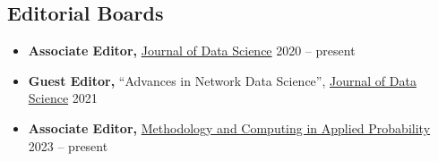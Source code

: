 \documentclass[12pt]{article}
\begin{document}
	
	\subsection*{Editorial Boards}
	\begin{itemize}
		\item \textbf{Associate Editor,} 
		\href{https://jds-online.org/journal/JDS}{Journal of Data Science} \hfill 2020 -- present
		\item \textbf{Guest Editor,} ``Advances in Network Data 
		Science'', \href{https://jds-online.org/journal/JDS}{Journal 
		of Data Science} \hfill 2021
		\item \textbf{Associate Editor,}
		\href{https://www.springer.com/journal/11009/}{Methodology 
		and Computing in Applied Probability} \hfill 2023 -- present
	\end{itemize}
\end{document}
